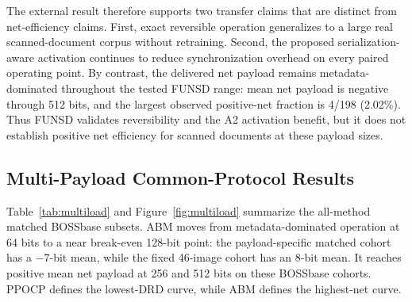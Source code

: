 The external result therefore supports two transfer claims that are distinct
from net-efficiency claims. First, exact reversible operation generalizes to a
large real scanned-document corpus without retraining. Second, the proposed
serialization-aware activation continues to reduce synchronization overhead on
every paired operating point. By contrast, the delivered net payload remains
metadata-dominated throughout the tested FUNSD range: mean net payload is
negative through 512 bits, and the largest observed positive-net fraction is
4/198 (2.02\%). Thus FUNSD validates reversibility and the A2 activation
benefit, but it does not establish positive net efficiency for scanned
documents at these payload sizes.
\RevisionAddEnd

\subsection{Multi-Payload Common-Protocol Results}

\RevisionAddBegin
Table~\ref{tab:multiload} and Figure~\ref{fig:multiload} summarize the
all-method matched BOSSbase subsets. ABM moves from metadata-dominated operation
at 64 bits to a near break-even 128-bit point: the payload-specific matched
cohort has a $-7$-bit mean, while the fixed 46-image cohort has an 8-bit mean.
It reaches positive mean net payload at 256 and 512 bits on these BOSSbase
cohorts. PPOCP defines the lowest-DRD curve, while ABM defines the highest-net
curve.
\RevisionAddEnd

